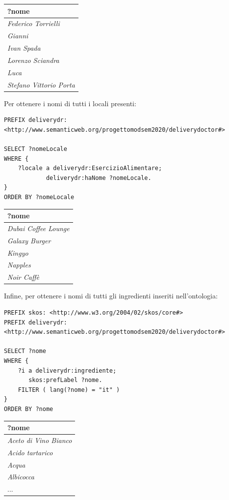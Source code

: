 \documentclass[12pt]{article}
\begin{document}
\begin{tabularx}{\textwidth} { 
  | >{\centering\arraybackslash}X |}
 \hline
 \textbf{?nome} \\
 \hline
 \textit{Federico Torrielli} \\
 \hline
 \textit{Gianni} \\
 \hline
 \textit{Ivan Spada} \\
 \hline
 \textit{Lorenzo Sciandra} \\
 \hline    
 \textit{Luca} \\
 \hline
 \textit{Stefano Vittorio Porta} \\
\hline
\end{tabularx}
\newline
\newline
Per ottenere i nomi di tutti i locali presenti:
\begin{lstlisting}[language=SPARQL]
PREFIX deliverydr: 
<http://www.semanticweb.org/progettomodsem2020/deliverydoctor#>

SELECT ?nomeLocale
WHERE {
    ?locale a deliverydr:EsercizioAlimentare;
            deliverydr:haNome ?nomeLocale.
}
ORDER BY ?nomeLocale
\end{lstlisting}
\begin{tabularx}{\textwidth} { 
  | >{\centering\arraybackslash}X |}
 \hline
 \textbf{?nome} \\
 \hline
 \textit{Dubai Coffee Lounge} \\
 \hline
 \textit{Galaxy Burger} \\
 \hline
 \textit{Kingyo} \\
 \hline
 \textit{Napples} \\
 \hline
 \textit{Noir Caffè} \\
\hline
\end{tabularx}
\newline
\newline
Infine, per ottenere i nomi di tutti gli ingredienti inseriti nell'ontologia:
\begin{lstlisting}[language=SPARQL]
PREFIX skos: <http://www.w3.org/2004/02/skos/core#>
PREFIX deliverydr: 
<http://www.semanticweb.org/progettomodsem2020/deliverydoctor#>

SELECT ?nome
WHERE {
    ?i a deliverydr:ingrediente;
       skos:prefLabel ?nome.
    FILTER ( lang(?nome) = "it" )
}
ORDER BY ?nome
\end{lstlisting}
\begin{tabularx}{\textwidth} { 
  | >{\centering\arraybackslash}X |}
 \hline
 \textbf{?nome} \\
 \hline
 \textit{Aceto di Vino Bianco} \\
 \hline
 \textit{Acido tartarico} \\
 \hline
 \textit{Acqua} \\
 \hline
 \textit{Albicocca} \\
 \hline
 ... \\
\hline
\end{tabularx}
\end{document}
